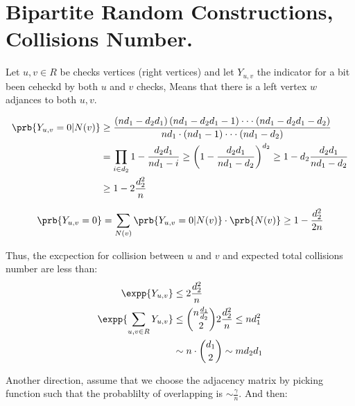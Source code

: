 \section{Bipartite Random Constructions, Collisions Number.}

Let $u,v\in R$ be checks vertices (right vertices) and let $Y_{u,v}$ the
indicator for a bit been ceheckd by both $u$ and $v$ checks, Means that there
is a left vertex $w$ adjances to both $u,v$.

\begin{equation*}
  \begin{split}
    \prb{Y_{u,v} = 0  | N(v)} & \ge \frac{ \left( nd_{1} - d_{2}d_{1} \right)
      \left( nd_{1} - d_{2}d_{1} - 1 \right)\cdot\cdot\cdot\left( nd_{1} -
    d_{2}d_{1} - d_{2}  \right)   }{ nd_{1} \cdot \left( nd_{1} - 1 \right)
    \cdot\cdot\cdot \left( nd_{1} - d_{2} \right)  }  \\
    & = \prod_{i \in d_{2}}{ 1 - \frac{d_2d_1}{nd_1 - i} }\ge  \left( 1 -
    \frac{d_2d_1}{nd_1 - d_{2}} \right)^{d_2} \ge 1  - d_{2}\frac{d_2d_1}{nd_1 -
    d_{2}}\\
    & \ge 1 - 2\frac{d_{2}^{2}}{n}
  \end{split}
\end{equation*}

\ifdefined\DETAILS
\begin{equation*}
  \begin{split}
    \prb{Y_{u,v} = 0 } = \sum_{N(v)}{\prb{Y_{u,v} = 0 | N(v) } \cdot
    \prb{N(v)}} \ge  1 - \frac{d_{2}^{2}}{2n}
  \end{split}
\end{equation*}
\fi

Thus, the excpection for collision between $u$ and $v$ and expected total
collisions number are less than:
\begin{equation*}
  \begin{split}
    \expp{Y_{u,v}} &\le 2\frac{d_{2}^{2}}{n}\\
    \expp{\sum_{u,v \in R}Y_{u,v}} &\le { n\frac{d_1}{d_2} \choose 2 }
    2\frac{d_{2}^{2}}{n} \le nd_1^{2}\\
    & \sim n \cdot { d_{1} \choose 2 } \sim m d_{2}d_{1}
  \end{split}
\end{equation*}

Another direction, assume that we choose the adjacency matrix by picking
function such that the probablilty of overlapping is $\sim \frac{\gamma}{n}$.
And then:

